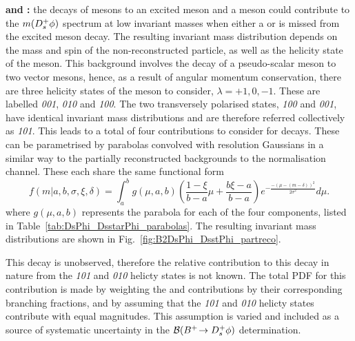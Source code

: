 \begin{description}
\item \textbf{\decay{\Bp}{(\decay{\Dssp}{\Dsp[\Pgamma]})\phiz} and \decay{\Bp}{(\decay{\Dssp}{\Dsp[\piz]})\phiz}:} the decays of \Bp mesons to an excited \Dsp meson and a \phiz meson could contribute to the $m({{D}^+_{s}}\phi)$ spectrum at low invariant masses when either a \piz or \Pgamma is missed from the excited meson decay. The resulting invariant mass distribution depends on the mass and spin of the non-reconstructed particle, as well as the helicity state of the \Dssp meson. This background involves the decay of a pseudo-scalar meson to two vector mesons, hence, as a result of angular momentum conservation, there are three helicity states of the \Dssp meson to consider, $\lambda = +1,0,-1$. These are labelled \emph{001}, \emph{010} and \emph{100}. The two transversely polarised states, \emph{100} and \emph{001}, have identical invariant mass distributions and are therefore referred collectively as \emph{101}. This leads to a total of four contributions to consider for \decay{\Bp}{\Dssp\phiz} decays. These can be parametrised by parabolas convolved with resolution Gaussians in a similar way to the partially reconstructed backgrounds to the normalisation channel.
These each share the same functional form
\begin{equation}
f(m|a,b,\sigma,\xi, \delta) = \int_{a}^{b} g(\mu,a,b) \left( \frac{1-\xi}{b-a}\mu + \frac{b\xi-a}{b-a} \right) e^{-\frac{-(\mu-(m-\delta))^{2}}{2\sigma^{2}}} d\mu.
\label{eq:DsPhi_DsstarPhi_shapes}
\end{equation}
where $g(\mu,a,b)$ represents the parabola for each of the four components, listed in Table~\ref{tab:DsPhi_DsstarPhi_parabolas}. The resulting invariant mass distributions are shown in Fig.~\ref{fig:B2DsPhi_DsstPhi_partreco}.

This decay is unobserved, therefore the relative contribution to this decay in nature from the \emph{101} and \emph{010} helicty states is not known. The total PDF for this contribution is made by weighting the \piz and \Pgamma contributions by their corresponding branching fractions, and by assuming that the \emph{101} and \emph{010} helicty states contribute with equal magnitudes. This assumption is varied and included as a source of systematic uncertainty in the ${\mathcal{B}}({{{B}^+}}\!\rightarrow {\ensuremath{{D}^+_{s}}}\phi)$ determination.
\end{description}
 
